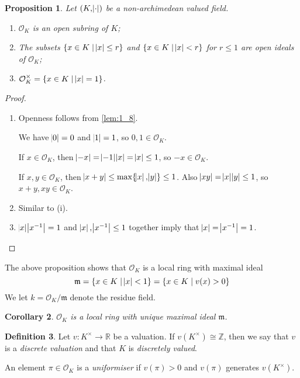 \documentclass[11pt]{article}
\theoremstyle{definition}
\newtheorem{definition}{Definition}[subsection]
\theoremstyle{plain}
\newtheorem{proposition}[definition]{Proposition}
\newtheorem{corollary}[definition]{Corollary}
\theoremstyle{remark}
\newcommand{\ZZ}{\mathbb{Z}}
\newcommand{\RR}{\mathbb{R}}
\newcommand{\cO}{\mathcal{O}}
\newcommand{\fm}{\mathfrak{m}}
\begin{document}
\begin{proposition}\label{prop:2_3}
    Let $(K, \abs{\cdot})$ be a non-archimedean valued field.
    \begin{enumerate}
        \item $\cO_K$ is an open subring of $K$;
        \item The subsets $\{x \in K \mid \abs{x} \le r\}$ and $\{x \in K \mid \abs{x} < r\}$ for $r \le 1$ are open ideals of $\cO_K$;
        \item $\cO_K^\times = \{x \in K \mid \abs{x} = 1\}$.
    \end{enumerate}
\end{proposition}
\begin{proof}\phantom{}
    \begin{enumerate}
        \item Openness follows from \autoref{lem:1_8}.

            \noindent We have $\abs{0} = 0$ and $\abs{1} = 1$, so $0, 1 \in \cO_K$.

            \noindent If $x \in \cO_K$, then $\abs{-x} = \abs{-1}\abs{x} = \abs{x} \le 1$, so $-x \in \cO_K$.

            \noindent If $x, y \in \cO_K$, then $\abs{x + y} \le \max \{\abs{x}, \abs{y}\} \le 1$. Also $\abs{x y} = \abs{x} \abs{y} \le 1$, so $x + y, x y \in \cO_K$.

        \item Similar to (i).

        \item $\abs{x} \abs{x^{-1}} = 1$ and $\abs{x}, \abs{x^{-1}} \le 1$ together imply that $\abs{x} = \abs{x^{-1}} = 1$. \qedhere
    \end{enumerate}
\end{proof}

\noindent The above proposition shows that $\cO_K$ is a local ring with maximal ideal
\begin{equation*}
    \fm = \{x \in K \mid \abs{x} < 1\} = \{x \in K \mid v(x) > 0\}
\end{equation*}
We let $k = \cO_K / \fm$ denote the residue field.

\begin{corollary}\label{cor:2_4}
    $\cO_K$ is a local ring with unique maximal ideal $\fm$.
\end{corollary}

\begin{definition}\label{def:2_5}
    Let $v : K^\times \to \RR$ be a valuation. If $v(K^\times) \cong \ZZ$, then we say that $v$ is a \emph{discrete valuation} and that $K$ is \emph{discretely valued}.

    An element $\pi \in \cO_K$ is a \emph{uniformiser} if $v(\pi) > 0$ and $v(\pi)$ generates $v(K^\times)$.
\end{definition}
\end{document}
